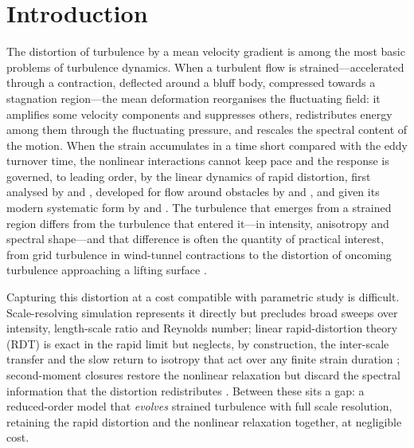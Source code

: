 \documentclass[11pt,a4paper]{article}
\begin{document}
\begin{keywords}
\end{keywords}

\section{Introduction}\label{sec:intro}

The distortion of turbulence by a mean velocity gradient is among the
most basic problems of turbulence dynamics. When a turbulent flow is
strained---accelerated through a contraction, deflected around a bluff
body, compressed towards a stagnation region---the mean deformation
reorganises the fluctuating field: it amplifies some velocity components
and suppresses others, redistributes energy among them through the
fluctuating pressure, and rescales the spectral content of the motion.
When the strain accumulates in a time short compared with the eddy
turnover time, the nonlinear interactions cannot keep pace and the
response is governed, to leading order, by the linear dynamics of rapid
distortion, first analysed by \citet{BatchelorProudman1954} and
\citet{TownsendBook1976}, developed for flow around obstacles by
\citet{Hunt1973} and \citet{HuntGraham1978}, and given its modern
systematic form by \citet{HuntCarruthers1990} and
\citet{SagautCambon2018}. The turbulence that emerges from a strained
region differs from the turbulence that entered it---in intensity,
anisotropy and spectral shape---and that difference is often the
quantity of practical interest, from grid turbulence in wind-tunnel
contractions \citep{MillsCorrsin1959,TuckerReynolds1968,LeeReynolds1985}
to the distortion of oncoming turbulence approaching a lifting surface
\citep{HuntGraham1978,GoldsteinAtassi1976}.

Capturing this distortion at a cost compatible with parametric study is
difficult. Scale-resolving simulation represents it directly but
precludes broad sweeps over intensity, length-scale ratio and Reynolds
number; linear rapid-distortion theory (RDT) is exact in the rapid limit
but neglects, by construction, the inter-scale transfer and the slow
return to isotropy that act over any finite strain duration
\citep{SagautCambon2018}; second-moment closures restore the nonlinear
relaxation but discard the spectral information that the distortion
redistributes \citep{LaunderReeceRodi1975,Pope2000}. Between these sits
a gap: a reduced-order model that \emph{evolves} strained turbulence
with full scale resolution, retaining the rapid distortion and the
nonlinear relaxation together, at negligible cost.
\end{document}

